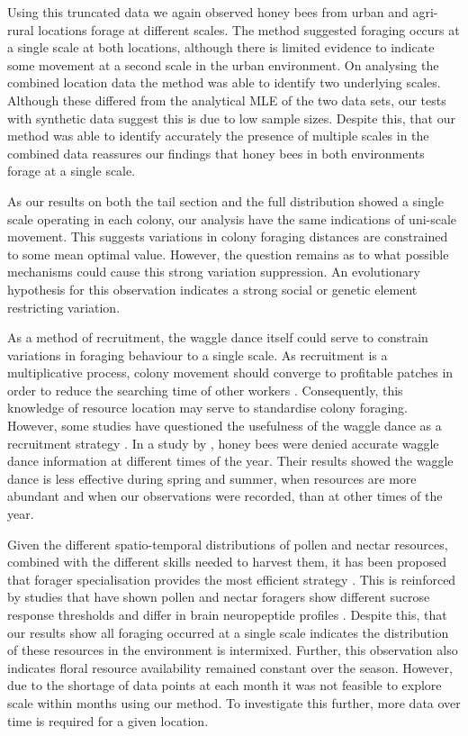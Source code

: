 \documentclass[11pt,usenames,dvipsnames]{article}
\begin{document}
\begin{linenumbers}
Using this truncated data we again observed honey bees from urban and agri-rural locations forage at different scales. The method suggested foraging occurs at a single scale at both locations, although there is limited evidence to indicate some movement at a second scale in the urban environment. On analysing the combined location data the method was able to identify two underlying scales. Although these differed from the analytical MLE of the two data sets, our tests with synthetic data suggest this is due to low sample sizes. Despite this, that our method was able to identify accurately the presence of multiple scales in the combined data reassures our findings that honey bees in both environments forage at a single scale. 

As our results on both the tail section and the full distribution showed a single scale operating in each colony, our analysis have the same indications of uni-scale movement. This suggests variations in colony foraging distances are constrained to some mean optimal value. However, the question remains as to what possible mechanisms could cause this strong variation suppression. An evolutionary hypothesis for this observation indicates a strong social or genetic element restricting variation.

As a method of recruitment, the waggle dance itself could serve to constrain variations in foraging behaviour to a single scale. As recruitment is a multiplicative process, colony movement should converge to profitable patches in order to reduce the searching time of other workers \citep{Seeley1995}. Consequently, this knowledge of resource location may serve to standardise colony foraging. However, some studies have questioned the usefulness of the waggle dance as a recruitment strategy \citep{Sherman2002, Dornhaus2004, Gruter2008, Gruter2009, Schurch2013}. In a study by \cite{Sherman2002}, honey bees were denied accurate waggle dance information at different times of the year. Their results showed the waggle dance is less effective during spring and summer, when resources are more abundant and when our observations were recorded, than at other times of the year.

Given the different spatio-temporal distributions of pollen and nectar resources, combined with the different skills needed to harvest them, it has been proposed that forager specialisation provides the most efficient strategy \citep{Duarte2012}. This is reinforced by studies that have shown pollen and nectar foragers show different sucrose response thresholds \citep{Pankiw2000} and differ in brain neuropeptide profiles \citep{Brockmann2009}. Despite this, that our results show all foraging occurred at a single scale indicates the distribution of these resources in the environment is intermixed. Further, this observation also indicates floral resource availability remained constant over the season. However, due to the shortage of data points at each month it was not feasible to explore scale within months using our method. To investigate this further, more data over time is required for a given location.


\end{linenumbers}
\end{document}
